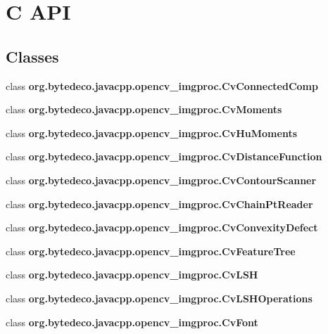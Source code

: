 \hypertarget{group__imgproc__c}{}\section{C A\+PI}
\label{group__imgproc__c}
\subsection*{Classes}
\begin{DoxyCompactItemize}
\item 
class {\bfseries org.\+bytedeco.\+javacpp.\+opencv\+\_\+imgproc.\+Cv\+Connected\+Comp}
\item 
class {\bfseries org.\+bytedeco.\+javacpp.\+opencv\+\_\+imgproc.\+Cv\+Moments}
\item 
class {\bfseries org.\+bytedeco.\+javacpp.\+opencv\+\_\+imgproc.\+Cv\+Hu\+Moments}
\item 
class {\bfseries org.\+bytedeco.\+javacpp.\+opencv\+\_\+imgproc.\+Cv\+Distance\+Function}
\item 
class {\bfseries org.\+bytedeco.\+javacpp.\+opencv\+\_\+imgproc.\+Cv\+Contour\+Scanner}
\item 
class {\bfseries org.\+bytedeco.\+javacpp.\+opencv\+\_\+imgproc.\+Cv\+Chain\+Pt\+Reader}
\item 
class {\bfseries org.\+bytedeco.\+javacpp.\+opencv\+\_\+imgproc.\+Cv\+Convexity\+Defect}
\item 
class {\bfseries org.\+bytedeco.\+javacpp.\+opencv\+\_\+imgproc.\+Cv\+Feature\+Tree}
\item 
class {\bfseries org.\+bytedeco.\+javacpp.\+opencv\+\_\+imgproc.\+Cv\+L\+SH}
\item 
class {\bfseries org.\+bytedeco.\+javacpp.\+opencv\+\_\+imgproc.\+Cv\+L\+S\+H\+Operations}
\item 
class {\bfseries org.\+bytedeco.\+javacpp.\+opencv\+\_\+imgproc.\+Cv\+Font}
\end{DoxyCompactItemize}
